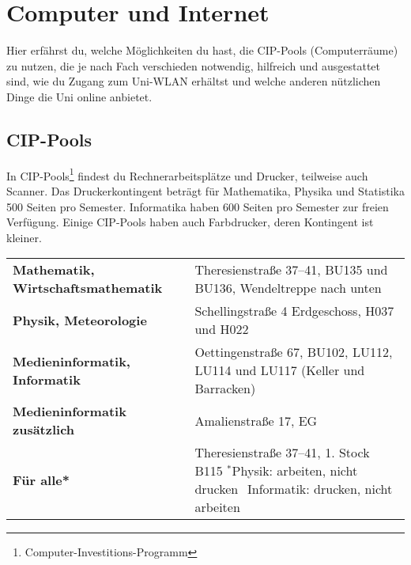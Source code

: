 ﻿\chapter{Computer und Internet}
Hier erfährst du, welche Möglichkeiten du hast, die CIP-Pools (Computerräume) zu nutzen, die je nach Fach verschieden notwendig, hilfreich und ausgestattet sind, wie du Zugang zum Uni-WLAN erhältst 
und welche anderen nützlichen Dinge die Uni online anbietet.

\section{CIP-Pools}
In CIP-Pools\footnote{Computer-Investitions-Programm} findest du Rechnerarbeitsplätze und Drucker, teilweise auch Scanner. Das Druckerkontingent beträgt für Mathematika, Physika und Statistika 500 Seiten pro Semester. Informatika haben 600 Seiten pro Semester zur freien Verfügung. Einige CIP-Pools haben auch Farbdrucker, deren Kontingent ist kleiner.

\begin{tabularx}{\linewidth}{lX}
\textbf{Mathematik, Wirtschaftsmathematik} %
& Theresienstraße 37--41, BU135 und BU136, Wendeltreppe nach unten\\
\textbf{Physik, Meteorologie} %
& Schellingstraße 4 Erdgeschoss, H037 und H022\\
\textbf{Medieninformatik, Informatik}  %
& Oettingenstraße 67, BU102, LU112, LU114 und LU117 (Keller und Barracken)\\
\textbf{Medieninformatik zusätzlich} %
& Amalienstraße 17, EG\\
\textbf{Für alle*}    %
& Theresienstraße 37--41, 1. Stock B115 \newline
\footnotesize{$^*$Physik: arbeiten, nicht drucken \newline $\phantom{^*}$Informatik: drucken, nicht arbeiten}
\end{tabularx}

